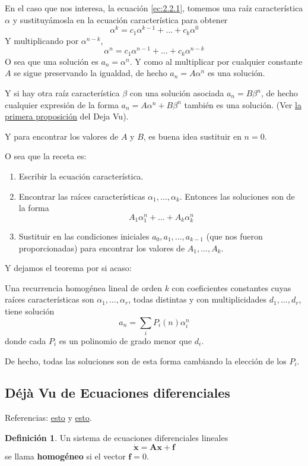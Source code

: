 \documentclass[spanish]{book}
\theoremstyle{definition}
\newtheorem*{defn}{Definición}
\begin{document}
	En el caso que nos interesa, la ecuación \eqref{ec:2.2.1}, tomemos una raíz característica $\alpha$ y sustituyámosla en la ecuación característica para obtener
	\[\alpha^k=c_1\alpha^{k-1}+\ldots+c_k\alpha^{0}\]
	Y multiplicando por $\alpha^{n-k}$,
	\[\alpha^n=c_1\alpha^{n-1}+\ldots+c_k\alpha^{n-k}\]
	O sea que una solución es $a_n=\alpha^n$. Y como al multiplicar por cualquier constante $A$ se sigue preservando la igualdad, de hecho $a_n=A\alpha^n$ es una solución.
	
	Y si hay otra raíz característica $\beta$ con una solución asociada $a_n=B\beta^n$, de hecho cualquier expresión de la forma $a_n=A\alpha^n+B\beta^n$ también es una solución. (Ver \hyperref[prop:2.2.2.1.1]{la primera proposición} del Deja Vu).
	
	Y para encontrar los valores de $A$ y $B$, es buena idea sustituir en $n=0$.
	
	O sea que la receta es:
	\begin{enumerate}
		\item Escribir la ecuación característica.
		\item Encontrar las raíces características $\alpha_1,\ldots,\alpha_k$. Entonces las soluciones son de la forma
		\[A_1\alpha_1^n+\ldots+A_k\alpha_k^n\]
		\item Sustituir en las condiciones iniciales $a_0,a_1,\ldots,a_{k-1}$ (que nos fueron proporcionadas) para encontrar los valores de $A_1,...,A_k$.
	\end{enumerate}
	Y dejamos el teorema por si acaso:
	\begin{teo}
		Una recurrencia homogénea lineal de orden $k$ con coeficientes constantes cuyas raíces características son $\alpha_1,\ldots,\alpha_r$, todas distintas y con multiplicidades $d_1,\ldots,d_r$, tiene solución
		\[a_n=\sum_iP_i(n)\alpha_i^n\]
		donde cada $P_i$ es un polinomio de grado menor que $d_i$.
	\end{teo}
	De hecho, todas las soluciones son de esta forma cambiando la elección de los $P_i$.
\subsection{Déjà Vu de Ecuaciones diferenciales}
	Referencias: \href{http://www.cds.caltech.edu/~murray/courses/cds101/fa02/precourse/delvecchio-26sep02.pdf}{esto} y \href{https://tutorial.math.lamar.edu/Classes/DE/SolutionsToSystems.aspx#mjx-eqn-eqeq1}{esto}.
	\begin{defn}Un sistema de ecuaciones diferenciales lineales
	\begin{equation}\label{ec:2.2.1.1}
		\dot{\mathbf{x}}=\mathbf{A}\mathbf{x}+\mathbf{f}
	\end{equation}
	se llama \textbf{homogéneo} si el vector $\mathbf{f}=0$.
	\end{defn}
\end{document}
